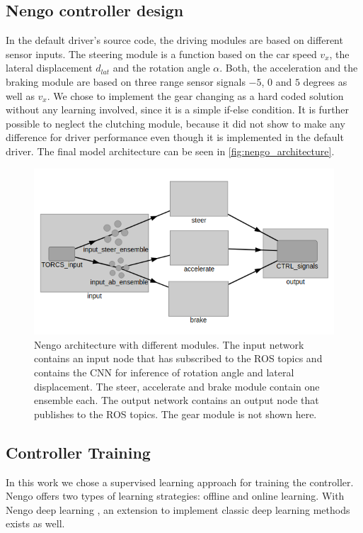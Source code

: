\documentclass[10pt,a4paper,twoside,journal]{IEEEtran}
\begin{document}
\subsection{Nengo controller design}
In the default driver's source code, the driving modules are based on different sensor inputs. The steering module is a function based on the car speed $v_x$, the lateral displacement $d_{lat}$ and the rotation angle $\alpha$. Both, the acceleration and the braking module are based on three range sensor signals $-5$, $0$ and $5$ degrees as well as $v_x$. We chose to implement the gear changing as a hard coded solution without any learning involved, since it is a simple if-else condition. It is further possible to neglect the clutching module, because it did not show to make any difference for driver performance even though it is implemented in the default driver. The final model architecture can be seen in \autoref{fig:nengo_architecture}.\\
\begin{figure}[ht]
	\centering
	\includegraphics[width=\columnwidth]{attachments/nengo_architecture.png}
	\caption{Nengo architecture with different modules. The input network contains an input node that has subscribed to the ROS topics and contains the CNN for inference of rotation angle and lateral displacement. The steer, accelerate and brake module contain one ensemble each. The output network contains an output node that publishes to the ROS topics. The gear module is not shown here.}
	\label{fig:nengo_architecture}
\end{figure}

\subsection{Controller Training}
In this work we chose a supervised learning approach for training the controller. Nengo offers two types of learning strategies: offline and online learning.
With Nengo deep learning \cite{nengo_dl}, an extension to implement classic deep learning methods exists as well.
\end{document}
